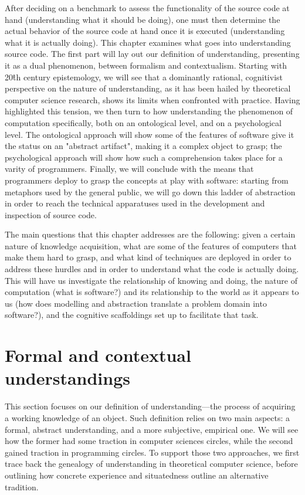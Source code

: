 After deciding on a benchmark to assess the functionality of the source code at hand (understanding what it should be doing), one must then determine the actual behavior of the source code at hand once it is executed (understanding what it is actually doing). This chapter examines what goes into understanding source code. The first part will lay out our definition of understanding, presenting it as a dual phenomenon, between formalism and contextualism. Starting with 20\^{th} century epistemology, we will see that a dominantly rational, cognitivist perspective on the nature of understanding, as it has been hailed by theoretical computer science research, shows its limits when confronted with practice. Having highlighted this tension, we then turn to how understanding the phenomenon of computation specifically, both on an ontological level, and on a psychological level. The ontological approach will show some of the features of software give it the status on an "abstract artifact", making it a complex object to grasp; the psychological approach will show how such a comprehension takes place for a varity of programmers. Finally, we will conclude with the means that programmers deploy to grasp the concepts at play with software: starting from metaphors used by the general public, we will go down this ladder of abstraction in order to reach the technical apparatuses used in the development and inspection of source code.

The main questions that this chapter addresses are the following: given a certain nature of knowledge acquisition, what are some of the features of computers that make them hard to grasp, and what kind of techniques are deployed in order to address these hurdles and in order to understand what the code is actually doing. This will have us investigate the relationship of knowing and doing, the nature of computation (what is software?) and its relationship to the world as it appears to us (how does modelling and abstraction translate a problem domain into software?), and the cognitive scaffoldings set up to facilitate that task.

\section{Formal and contextual understandings} %

This section focuses on our definition of understanding—the process of acquiring a working knowledge of an object. Such definition relies on two main aspects: a formal, abstract understanding, and a more subjective, empirical one. We will see how the former had some traction in computer sciences circles, while the second gained traction in programming circles. To support those two approaches, we first trace back the genealogy of understanding in theoretical computer science, before outlining how concrete experience and situatedness outline an alternative tradition.

